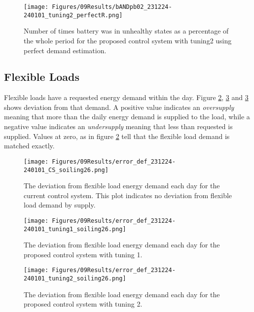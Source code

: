 \begin{figure}[h]
    \centering
    \texttt{[image: Figures/09Results/bANDpb02\_231224-240101\_tuning2\_perfectR.png]}
    \caption[Battery results proposed control system 2 perfect R]{Number of times battery was in unhealthy states as a percentage of the whole period for the proposed control system with tuning2 using perfect demand estimation. }
    \label{fig:bANDpb02_231224-240101_tuning2_perfectR}
\end{figure}

\subsection{Flexible Loads}

Flexible loads have a requested energy demand within the day. Figure \ref{fig:error_def_231224-240101_CS_soiling26}, \ref{fig:error_def_231224-240101_tuning1_soiling26} and \ref{fig:error_def_231224-240101_tuning1_soiling26} shows deviation from that demand. A positive value indicates an \textit{oversupply} meaning that more than the daily energy demand is supplied to the load, while a negative value indicates an \textit{undersupply} meaning that less than requested is supplied. Values at zero, as in figure \ref{fig:error_def_231224-240101_CS_soiling26} tell that the flexible load demand is matched exactly.

\begin{figure}[h]
    \centering
    \texttt{[image: Figures/09Results/error\_def\_231224-240101\_CS\_soiling26.png]}
    \caption[Flexible load deviation current control system]{The deviation from flexible load energy demand each day for the current control system. This plot indicates no deviation from flexible load demand by supply. }
    \label{fig:error_def_231224-240101_CS_soiling26}
\end{figure}

\begin{figure}[h]
    \centering
    \texttt{[image: Figures/09Results/error\_def\_231224-240101\_tuning1\_soiling26.png]}
    \caption[Flexible load deviation proposed control system 1]{The deviation from flexible load energy demand each day for the proposed control system with tuning 1. }
    \label{fig:error_def_231224-240101_tuning1_soiling26}
\end{figure}

\begin{figure}[h]
    \centering
    \texttt{[image: Figures/09Results/error\_def\_231224-240101\_tuning2\_soiling26.png]}
    \caption[Flexible load deviation proposed control system 2]{The deviation from flexible load energy demand each day for the proposed control system with tuning 2. }
    \label{fig:error_def_231224-240101_tuning2_soiling26}
\end{figure}

